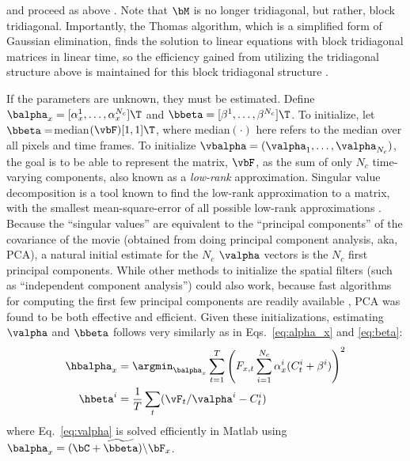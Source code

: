 \noindent and proceed as above%
.  Note that $\bM$ is no longer tridiagonal, but rather, block tridiagonal.  Importantly, the Thomas algorithm, which is a simplified form of Gaussian elimination, finds the solution to linear equations with block tridiagonal matrices in linear time, so the efficiency gained from utilizing the tridiagonal structure above is maintained for this block tridiagonal structure \cite{PRE92}.   

If the parameters are unknown, they must be estimated. Define $\balpha_x=[\alpha_x^1, \ldots, \alpha_x^{N_c}]\T$ and $\bbeta=[\beta^1, \ldots, \beta^{N_c}]\T$.  To initialize, let $\bbeta=$median$(\vbF)[1,1]\T$, where median$(\cdot)$ here refers to the median over all pixels and time frames. To initialize $\vbalpha=(\valpha_1, \ldots, \valpha_{N_c})$, the goal is to be able to represent the matrix, $\vbF$, as the sum of only $N_c$ time-varying components, also known as a \emph{low-rank} approximation.  Singular value decomposition is a tool known to find the low-rank approximation to a matrix, with the smallest mean-square-error of all possible low-rank approximations \cite{HornJohnson90}.  Because the ``singular values'' are equivalent to the ``principal components'' of the covariance of the movie (obtained from doing principal component analysis, aka, PCA), a natural initial estimate for the $N_c$ $\valpha$ vectors is the $N_c$ first principal components.  While other methods to initialize the spatial filters (such as ``independent component analysis'') could also work, because fast algorithms for computing the first few principal components are readily available \cite{RokhlinTygert09}, PCA was found to be both effective and efficient.  Given these initializations, estimating $\valpha$ and $\bbeta$ follows very similarly as in Eqs.~\eqref{eq:alpha_x} and \eqref{eq:beta}:
\begin{align} \label{eq:valpha}
	\hbalpha_x &= \argmin_{\balpha_x} \sum_{t=1}^T  \left(F_{x,t}  \sum_{i=1}^{N_c} \alpha_x^i (C_t^i + \beta^i)\right)^2 \\
	\hbeta^i &= \frac{1}{T}\sum_t (\vF_t / \valpha^i - C_t^i) \label{eq:vbeta}
\end{align}
where Eq.~\eqref{eq:valpha} is solved efficiently in Matlab using $\balpha_x = (\bC + \widetilde{\bbeta})\backslash \bF_x$.  


